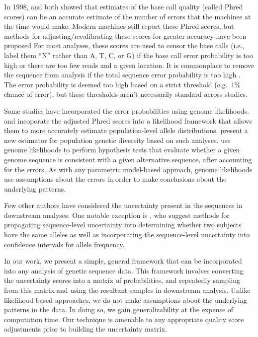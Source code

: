 \documentclass[
]{article}
\begin{document}
In 1998, \citet{ewingBaseCallingAutomatedSequencer1998} and
\citet{richterichEstimationErrorsRaw1998} both showed that estimates of
the base call quality (called Phred scores) can be an accurate estimate
of the number of errors that the machines at the time would make. Modern
machines still report these Phred scores, but methods for
adjusting/recalibrating these scores for greater accuracy have been
proposed \citep[\citet{depristoFrameworkVariationDiscovery2011},
\citet{liSNPDetectionMassively2009}]{liAdjustQualityScores2004} For most
analyses, these scores are used to censor the base calls (i.e., label
them ``N'' rather than A, T, C, or G) if the base call error probability
is too high or there are too few reads and a given location. It is
commonplace to remove the sequence from analysis if the total sequence
error probability is too high \citep[see,
e.g.,][\citet{robaskyRoleReplicatesError2014},
\citet{oraweAccountingUncertaintyDNA2015}]{doroninaPhylogeneticPositionEmended2005}.
The error probability is deemed too high based on a strict threshold
(e.g.~1\% chance of error), but these thresholds aren't necessarily
standard across studies.

Some studies have incorporated the error probabilities using genome
likelihoods. \citet{depristoFrameworkVariationDiscovery2011} and
\citet{gompertHierarchicalBayesianModel2011} incoporate the adjusted
Phred scores into a likelihood framework that allows them to more
accurately estimate population-level allele distributions.
\citet{fumagalliQuantifyingPopulationGenetic2013a} present a new
estimator for population genetic diversity based on such analyses.
\citet{kuoEAGLEExplicitAlternative2018} use genome likelihoods to
perform hypothesis tests that evaluate whether a given genome sequence
is consistent with a given alternative sequence, after accounting for
the errors. As with any parametric model-based approach, genome
likelihoods use assumptions about the errors in order to make
conclusions about the underlying patterns.

Few other authors have considered the uncertainty present in the
sequences in downstream analyses. One notable exception is
\citet{oraweAccountingUncertaintyDNA2015}, who suggest methods for
propagating sequence-level uncertainty into determining whether two
subjects have the same alleles as well as incorporating the
sequence-level uncertainty into confidence intervals for allele
frequency.

In our work, we present a simple, general framework that can be
incorporated into any analysis of genetic sequence data. This framework
involves converting the uncertainty scores into a matrix of
probabilities, and repeatedly sampling from this matrix and using the
resultant samples in downstream analysis. Unlike likelihood-based
approaches, we do not make assumptions about the underlying patterns in
the data. In doing so, we gain generalizability at the expense of
computation time. Our technique is amenable to any appropriate quality
score adjustments prior to building the uncertainty matrix.
\end{document}
